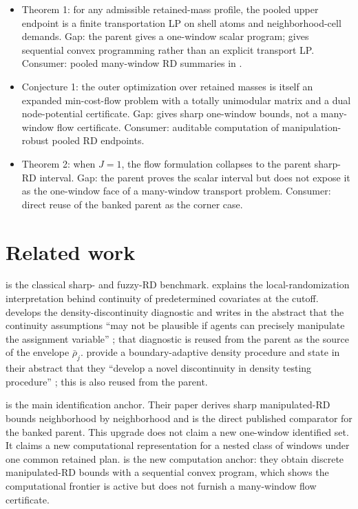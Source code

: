 \documentclass[11pt]{article}
\theoremstyle{definition}
\theoremstyle{plain}
\theoremstyle{remark}
\begin{document}
\begin{itemize}[leftmargin=*]
  \item Theorem 1: for any admissible retained-mass profile, the pooled upper endpoint is a finite
  transportation LP on shell atoms and neighborhood-cell demands. Gap: the parent gives a one-window
  scalar program; \citet{RosenmanRajkumarGauriotSlonim2019} gives sequential convex programming rather
  than an explicit transport LP. Consumer: pooled many-window RD summaries in \citet{Bertanha2020}.
  \item Conjecture 1: the outer optimization over retained masses is itself an expanded min-cost-flow
  problem with a totally unimodular matrix and a dual node-potential certificate. Gap:
  \citet{GerardRokkanenRothe2020} gives sharp one-window bounds, not a many-window flow certificate.
  Consumer: auditable computation of manipulation-robust pooled RD endpoints.
  \item Theorem 2: when \(J=1\), the flow formulation collapses to the parent sharp-RD interval. Gap:
  the parent proves the scalar interval but does not expose it as the one-window face of a many-window
  transport problem. Consumer: direct reuse of the banked parent as the corner case.
\end{itemize}

\section{Related work}
\citet{HahnToddVanDerKlaauw2001} is the classical sharp- and fuzzy-RD benchmark.  \citet{Lee2008} explains
the local-randomization interpretation behind continuity of predetermined covariates at the cutoff.
\citet{McCrary2008} develops the density-discontinuity diagnostic and writes in the abstract that the
continuity assumptions ``may not be plausible if agents can precisely manipulate the assignment variable''
\citep[p.~698]{McCrary2008}; that diagnostic is reused from the parent as the source of the envelope
\(\bar\rho_j\).  \citet{CattaneoJanssonMa2020} provide a boundary-adaptive density procedure and state in
their abstract that they ``develop a novel discontinuity in density testing procedure'' \citep[p.~1449]
{CattaneoJanssonMa2020}; this is also reused from the parent.

\citet{GerardRokkanenRothe2020} is the main identification anchor.  Their paper derives sharp manipulated-RD
bounds neighborhood by neighborhood and is the direct published comparator for the banked parent.  This
upgrade does not claim a new one-window identified set.  It claims a new computational representation for a
nested class of windows under one common retained plan.  \citet{RosenmanRajkumarGauriotSlonim2019} is the
new computation anchor: they obtain discrete manipulated-RD bounds with a sequential convex program, which
shows the computational frontier is active but does not furnish a many-window flow certificate.
\end{document}

